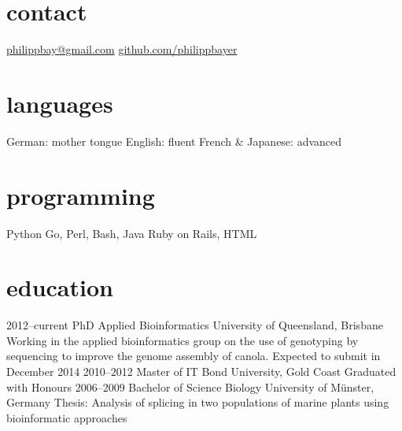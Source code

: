 \documentclass[]{friggeri-cv} %
\begin{document}


\begin{aside} %
\section{contact}
\href{mailto:philippbay@gmail.com}{philippbay@gmail.com}
\href{http://github.com/philippbayer}{github.com/philippbayer}
\section{languages}
German: mother tongue
English: fluent
French \& Japanese: advanced
\section{programming}
Python
Go, Perl, Bash, Java
Ruby on Rails, HTML
\end{aside}


\section{education}

\begin{entrylist}
\entry
{2012--current}
{PhD {\normalfont Applied Bioinformatics}}
{University of Queensland, Brisbane}
{Working in the applied bioinformatics group on the use of genotyping by sequencing to improve the genome assembly of canola. Expected to submit in December 2014}
\entry
{2010--2012}
{Master {\normalfont of IT}}
{Bond University, Gold Coast}
{Graduated with Honours}
\entry
{2006--2009}
{Bachelor of Science {\normalfont Biology}}
{University of Münster, Germany}
{Thesis: Analysis of splicing in two populations of marine plants
using bioinformatic approaches}
\end{entrylist}
\end{document}
